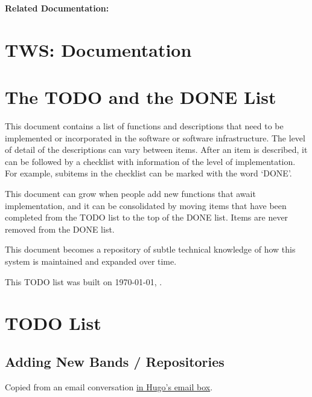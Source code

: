\documentclass[12pt]{article}
\begin{document}
{\bf Related Documentation:}

\section*{TWS: Documentation}

\section{The TODO and the DONE List}

This document contains a list of functions and descriptions that need
to be implemented or incorporated in the software or software
infrastructure.  The level of detail of the descriptions can vary
between items.  After an item is described, it can be followed by a
checklist with information of the level of implementation.  For
example, subitems in the checklist can be marked with the word `DONE'.

This document can grow when people add new functions that await
implementation, and it can be consolidated by moving items that have
been completed from the TODO list to the top of the DONE list.  Items
are never removed from the DONE list.

This document becomes a repository of subtle technical knowledge of
how this system is maintained and expanded over time.

This TODO list was built on \today, \thistime.


\section{TODO List}

\subsection{Adding New Bands / Repositories}

Copied from an email conversation
\href{https://mail.google.com/mail/?shva=1#inbox/139fccd6799c1896}{in
  Hugo's email box}.
\end{document}
